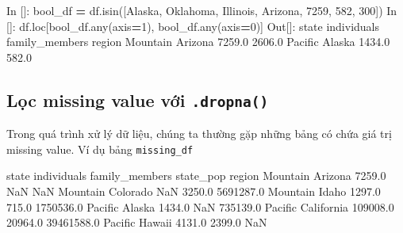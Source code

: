 \documentclass[
]{book}
\newenvironment{Shaded}{\begin{snugshade}}{\end{snugshade}}
\newcommand{\BuiltInTok}[1]{#1}
\newcommand{\DecValTok}[1]{\textcolor[rgb]{0.00,0.00,0.81}{#1}}
\newcommand{\FloatTok}[1]{\textcolor[rgb]{0.00,0.00,0.81}{#1}}
\newcommand{\NormalTok}[1]{#1}
\newcommand{\OperatorTok}[1]{\textcolor[rgb]{0.81,0.36,0.00}{\textbf{#1}}}
\newcommand{\StringTok}[1]{\textcolor[rgb]{0.31,0.60,0.02}{#1}}
\begin{document}
\begin{Shaded}
\begin{Highlighting}[]
\NormalTok{In []: bool\_df }\OperatorTok{=}\NormalTok{ df.isin([}\StringTok{\textquotesingle{}Alaska\textquotesingle{}}\NormalTok{, }\StringTok{\textquotesingle{}Oklahoma\textquotesingle{}}\NormalTok{, }\StringTok{\textquotesingle{}Illinois\textquotesingle{}}\NormalTok{, }\StringTok{\textquotesingle{}Arizona\textquotesingle{}}\NormalTok{, }\DecValTok{7259}\NormalTok{, }\DecValTok{582}\NormalTok{, }\DecValTok{300}\NormalTok{])}
\NormalTok{In []: df.loc[bool\_df.}\BuiltInTok{any}\NormalTok{(axis}\OperatorTok{=}\DecValTok{1}\NormalTok{), bool\_df.}\BuiltInTok{any}\NormalTok{(axis}\OperatorTok{=}\DecValTok{0}\NormalTok{)]}
\NormalTok{Out[]:}
\NormalTok{            state  individuals  family\_members}
\NormalTok{region                                        }
\NormalTok{Mountain  Arizona       }\FloatTok{7259.0}          \FloatTok{2606.0}
\NormalTok{Pacific    Alaska       }\FloatTok{1434.0}           \FloatTok{582.0}
\end{Highlighting}
\end{Shaded}

\subsection{\texorpdfstring{Lọc missing value với \texttt{.dropna()}}{Lọc missing value với .dropna()}}\label{lux1ecdc-missing-value-vux1edbi-.dropna}

Trong quá trình xử lý dữ liệu, chúng ta thường gặp những bảng có chứa giá trị missing value. Ví dụ bảng \texttt{missing\_df}

\begin{Shaded}
\begin{Highlighting}[]
\NormalTok{               state  individuals  family\_members   state\_pop}
\NormalTok{region                                                       }
\NormalTok{Mountain     Arizona       }\FloatTok{7259.0}\NormalTok{             NaN         NaN}
\NormalTok{Mountain    Colorado          NaN          }\FloatTok{3250.0}   \FloatTok{5691287.0}
\NormalTok{Mountain       Idaho       }\FloatTok{1297.0}           \FloatTok{715.0}   \FloatTok{1750536.0}
\NormalTok{Pacific       Alaska       }\FloatTok{1434.0}\NormalTok{             NaN    }\FloatTok{735139.0}
\NormalTok{Pacific   California     }\FloatTok{109008.0}         \FloatTok{20964.0}  \FloatTok{39461588.0}
\NormalTok{Pacific       Hawaii       }\FloatTok{4131.0}          \FloatTok{2399.0}\NormalTok{         NaN}
\end{Highlighting}
\end{Shaded}
\end{document}
